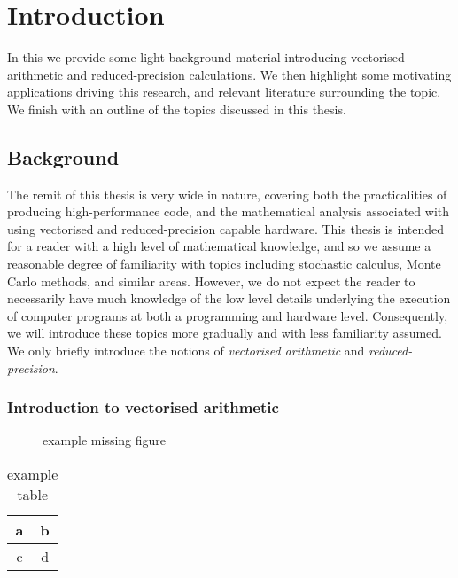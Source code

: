 \chapter{Introduction}
\label{chp:introduction}

In this  we provide some light background material introducing vectorised arithmetic and reduced-precision calculations. We then highlight some motivating applications driving this research, and relevant literature surrounding the topic. We finish with an outline of the topics discussed in this thesis. 

\section{Background}
\label{sec:background}

    The remit of this thesis is very wide in nature, covering both the practicalities of producing high-performance code, and the mathematical analysis associated with using vectorised and reduced-precision capable hardware. This thesis is intended for a reader with a high level of mathematical knowledge, and so we assume a reasonable degree of familiarity with topics including stochastic calculus, Monte Carlo methods, and similar areas. However, we do not expect the reader to necessarily have much knowledge of the low level details underlying the execution of computer programs at both a programming and hardware level. Consequently,  we will introduce these topics more gradually and with less familiarity assumed. We only briefly introduce the notions of \textit{vectorised arithmetic} and \textit{reduced-precision}.
    
\subsection{Introduction to vectorised arithmetic}
\label{subsec:introduction_to_vectorised_arithmetic}

    \begin{figure}[htb]
        \caption[example missing figure]{example missing figure}
    \end{figure}

    \begin{table}[htb] \centering
        \begin{tabular}{cc}
            a & b \\ \hline
            c & d
        \end{tabular}
    \caption[an example table]{example table}
    \end{table}

